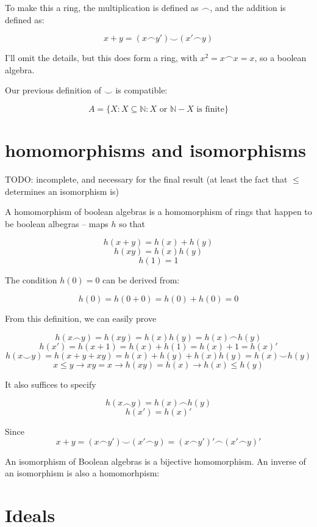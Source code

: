 \documentclass{article}
\begin{document}
    To make this a ring, the multiplication is defined as $\frown$, and the
    addition is defined as:

    \[ x + y = (x \frown y') \smile (x' \frown y)\]

    I'll omit the details, but this does form a ring, with $x^2 = x \frown x =
    x$, so a boolean algebra.

    Our previous definition of $\smile$ is compatible:


    \[A = \{X: X \subseteq \mathbb{N}: X \text{ or } \mathbb{N} - X \text{ is
    finite} \} \]

    \section{homomorphisms and isomorphisms}

    TODO: incomplete, and necessary for the final result (at least the fact that
    $\leq$ determines an isomorphism is)

    A homomorphism of boolean algebras is a homomorphism of rings that happen to
    be boolean albegras -- maps $h$ so that

    \[h(x+y) = h(x) + h(y)\]
    \[h(xy) = h(x)h(y)\]
    \[h(1) = 1\]

    The condition $h(0)= 0$ can be derived from:

    \[h(0) = h(0+0) = h(0)+h(0) = 0\]

    From this definition, we can easily prove

    \[h(x \frown y) = h(xy) = h(x)h(y) = h(x) \frown h(y)\]
    \[h(x') = h(x+1) = h(x) + h(1) = h(x) + 1 = h(x)'\]
    \[h(x \smile y) = h(x + y + xy) = h(x) + h(y) + h(x)h(y) = h(x) \smile
    h(y)\]
    \[x \leq y \rightarrow xy = x \rightarrow h(xy) = h(x) \rightarrow h(x) \leq
    h(y)\]

    It also suffices to specify

    \[ h(x \frown y) = h(x) \frown h(y) \]
    \[h(x') = h(x)'\]

    Since
    \[x + y = (x \frown y') \smile (x' \frown y) = (x \frown y')' \frown (x'
    \frown y)'\]

    An isomorphism of Boolean algebras is a bijective homomorphism. An inverse
    of an isomorphism is also a homomorhpism:

    \section{Ideals}
\end{document}
